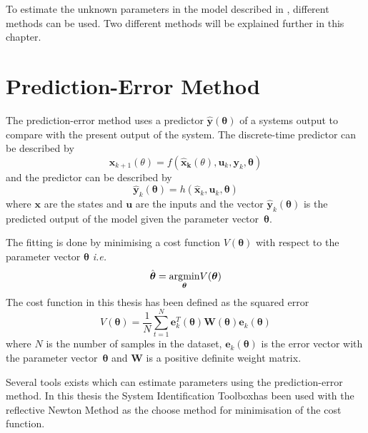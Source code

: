 To estimate the unknown parameters in the \abbrROV model described in , different methods can be used. Two different methods will be explained further in this chapter.  


\section{Prediction-Error Method}
The prediction-error method uses a predictor $\hat{\boldsymbol{y}}(\boldsymbol{\theta})$ of a systems output to compare with the present output of the system. The discrete-time predictor can be described by 
\begin{equation}
\boldsymbol{x}_{k+1}(\theta) = f(\boldsymbol{\hat{x}_k}(\theta), \boldsymbol{u}_k,\boldsymbol{y}_k, \boldsymbol{\theta})
\end{equation}
and the predictor can be described by
\begin{equation}
\hat{\boldsymbol{y}}_k(\boldsymbol{\theta}) = h(\hat{\boldsymbol{x}}_k, \boldsymbol{u}_k, \boldsymbol{\theta})
\end{equation}
where $\boldsymbol{x}$ are the states and $\boldsymbol{u}$ are the inputs and the vector $\hat{\boldsymbol{y}}_k(\boldsymbol{\theta})$ is the predicted output of the model given the parameter vector~$\boldsymbol{\theta}$. 

The fitting is done by minimising a cost function $V(\boldsymbol{\theta})$ with respect to the parameter vector $\boldsymbol{\theta}$ \emph{i.e.}
\begin{equation}
\hat{\boldsymbol{\theta}} = \underset{\boldsymbol{\theta}}{\operatorname*{\arg\!\min}} V(\boldsymbol{\theta})
\end{equation}
The cost function in this thesis has been defined as the squared error
\begin{equation}
    V(\boldsymbol{\theta}) = \frac{1}{N} \sum_{t=1}^{N} \boldsymbol{e}^T_k(\boldsymbol{\theta}) \boldsymbol{W}(\boldsymbol{\theta})  \boldsymbol{e}_k(\boldsymbol{\theta})
\end{equation}
where $N$ is the number of samples in the dataset, $\boldsymbol{e}_k(\boldsymbol{\theta})$ is the error vector with the parameter vector~$\boldsymbol{\theta}$ and $\boldsymbol{W}$ is a positive definite weight matrix.

Several tools exists	which can estimate parameters using the prediction-error method. In this thesis the System Identification Toolbox\texttrademark has been used with the reflective Newton Method as the choose method for minimisation of the cost function.

